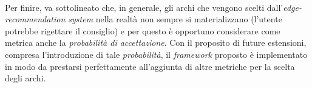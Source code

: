 \documentclass[trieste,12pt]{toptesi}
\makeatletter
\newcommand\listofcodes{%
 \iffrontmatter\else\frontmattertrue\fi
 \if@openright\cleardoublepage\else\clearpage\fi
 \begingroup\def\chapter##1{\@schapter}
 \phantomsection %
 \lstlistoflistings 
 \endgroup
}
\makeatother
\begin{document}
\\Per finire, va sottolineato che, in generale, gli archi che vengono scelti dall'\textit{edge-recommendation system} nella realtà non sempre si materializzano (l'utente potrebbe rigettare il consiglio) e per questo è opportuno considerare come metrica anche la \textit{probabilità di accettazione}. Con il proposito di future estensioni, compresa l'introduzione di tale \textit{probabilità}, il \textit{framework} proposto è implementato in modo da prestarsi perfettamente all'aggiunta di altre metriche per la scelta degli archi.





\tableofcontents

\listoffigures




\mainmatter


%





%
%

\nocite{*}
\printbibliography
\end{document}

